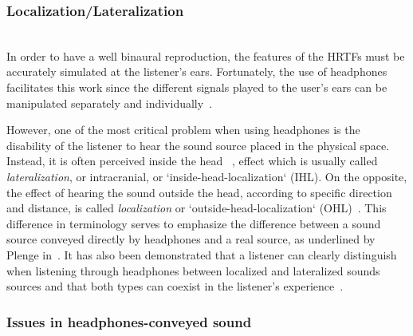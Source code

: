 \documentclass[journal]{IEEEtran}
\begin{document}
 

\subsubsection*{Localization/Lateralization}~\\

In order to have a well binaural reproduction, the features of the HRTFs must be accurately simulated at the listener's ears. Fortunately, the use of headphones facilitates this work since the different signals played to the user's ears can be manipulated separately and individually~\cite{plenge1972}.

However, one of the most critical problem when using headphones is the disability of the listener to hear the sound source placed in the physical space. Instead, it is often perceived inside the head ~\cite{harma2004}, effect which is usually called \emph{lateralization}, or intracranial, or `inside-head-localization` (IHL). On the opposite, the effect of hearing the sound outside the head, according to specific direction and distance, is called \emph{localization} or `outside-head-localization` (OHL)~\cite{plenge1972}. This difference in terminology serves to emphasize the difference between a sound source conveyed directly by headphones and a real source, as underlined by Plenge in~\cite{plenge1972}. It has also been demonstrated that a listener can clearly distinguish when listening through headphones between localized and lateralized sounds sources and that both types can coexist in the listener's experience~\cite{harma2004}.\\


\subsubsection*{Issues in headphones-conveyed sound}~\\
\end{document}
